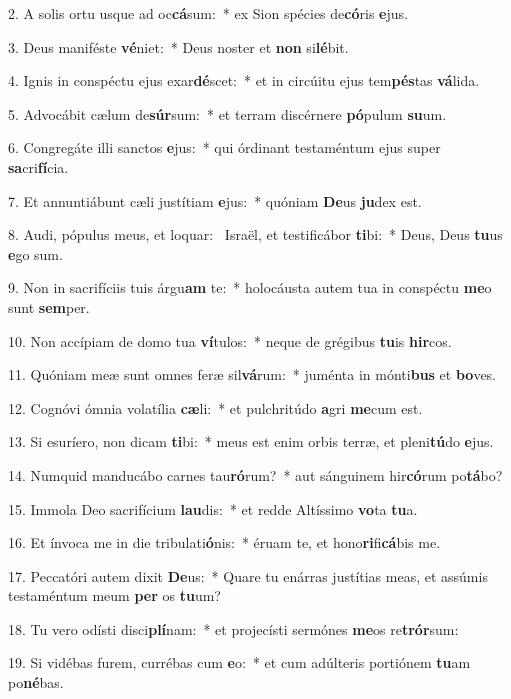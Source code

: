 2. A solis ortu usque ad oc\textbf{cá}sum:~*  ex Sion spécies de\textbf{có}ris \textbf{e}jus.\

3. Deus maniféste \textbf{vé}niet:~*  Deus noster et \textbf{non} si\textbf{lé}bit.\

4. Ignis in conspéctu ejus exar\textbf{dé}scet:~*  et in circúitu ejus tem\textbf{pés}tas \textbf{vá}lida.\

5. Advocábit cælum de\textbf{súr}sum:~*  et terram discérnere \textbf{pó}pulum \textbf{su}um.\

6. Congregáte illi sanctos \textbf{e}jus:~*  qui órdinant testaméntum ejus super \textbf{sa}cri\textbf{fí}cia.\

7. Et annuntiábunt cæli justítiam \textbf{e}jus:~*  quóniam \textbf{De}us \textbf{ju}dex est.\

8. Audi, pópulus meus, et loquar: \dag\  Israël, et testificábor \textbf{ti}bi:~*  Deus, Deus \textbf{tu}us \textbf{e}go sum.\

9. Non in sacrifíciis tuis árgu\textbf{am} te:~*  holocáusta autem tua in conspéctu \textbf{me}o sunt \textbf{sem}per.\

10. Non accípiam de domo tua \textbf{ví}tulos:~*  neque de grégibus \textbf{tu}is \textbf{hir}cos.\

11. Quóniam meæ sunt omnes feræ sil\textbf{vá}rum:~*  juménta in mónti\textbf{bus} et \textbf{bo}ves.\

12. Cognóvi ómnia volatília \textbf{cæ}li:~*  et pulchritúdo \textbf{a}gri \textbf{me}cum est.\

13. Si esuríero, non dicam \textbf{ti}bi:~*  meus est enim orbis terræ, et pleni\textbf{tú}do \textbf{e}jus.\

14. Numquid manducábo carnes tau\textbf{ró}rum?~*  aut sánguinem hir\textbf{có}rum po\textbf{tá}bo?\

15. Immola Deo sacrifícium \textbf{lau}dis:~*  et redde Altíssimo \textbf{vo}ta \textbf{tu}a.\

16. Et ínvoca me in die tribulati\textbf{ó}nis:~*  éruam te, et hono\textbf{ri}fi\textbf{cá}bis me.\

17. Peccatóri autem dixit \textbf{De}us:~*  Quare tu enárras justítias meas, et assúmis testaméntum meum \textbf{per} os \textbf{tu}um?\

18. Tu vero odísti disci\textbf{plí}nam:~*  et projecísti sermónes \textbf{me}os re\textbf{trór}sum:\

19. Si vidébas furem, currébas cum \textbf{e}o:~*  et cum adúlteris portiónem \textbf{tu}am po\textbf{né}bas.\

